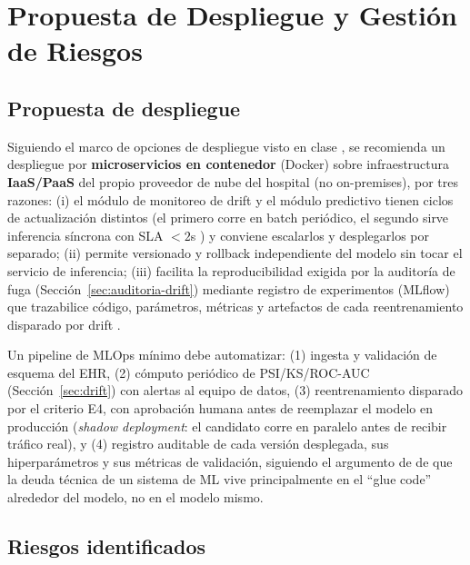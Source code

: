 \documentclass[11pt,a4paper]{article}
\begin{document}
\section{Propuesta de Despliegue y Gestión de Riesgos}

\subsection{Propuesta de despliegue}

Siguiendo el marco de opciones de despliegue visto en clase \cite{soriano2026}, se recomienda un despliegue por \textbf{microservicios en contenedor} (Docker) sobre infraestructura \textbf{IaaS/PaaS} del propio proveedor de nube del hospital (no on-premises), por tres razones: (i) el módulo de monitoreo de drift y el módulo predictivo tienen ciclos de actualización distintos (el primero corre en batch periódico, el segundo sirve inferencia síncrona con SLA $<2$s \cite{nawaz2026}) y conviene escalarlos y desplegarlos por separado; (ii) permite versionado y rollback independiente del modelo sin tocar el servicio de inferencia; (iii) facilita la reproducibilidad exigida por la auditoría de fuga (Sección~\ref{sec:auditoria-drift}) mediante registro de experimentos (MLflow) que trazabilice código, parámetros, métricas y artefactos de cada reentrenamiento disparado por drift \cite{soriano2026}.

Un pipeline de MLOps mínimo debe automatizar: (1) ingesta y validación de esquema del EHR, (2) cómputo periódico de PSI/KS/ROC-AUC (Sección~\ref{sec:drift}) con alertas al equipo de datos, (3) reentrenamiento disparado por el criterio E4, con aprobación humana antes de reemplazar el modelo en producción (\emph{shadow deployment}: el candidato corre en paralelo antes de recibir tráfico real), y (4) registro auditable de cada versión desplegada, sus hiperparámetros y sus métricas de validación, siguiendo el argumento de \cite{sculley2015} de que la deuda técnica de un sistema de ML vive principalmente en el ``glue code'' alrededor del modelo, no en el modelo mismo.

\subsection{Riesgos identificados}
\end{document}
